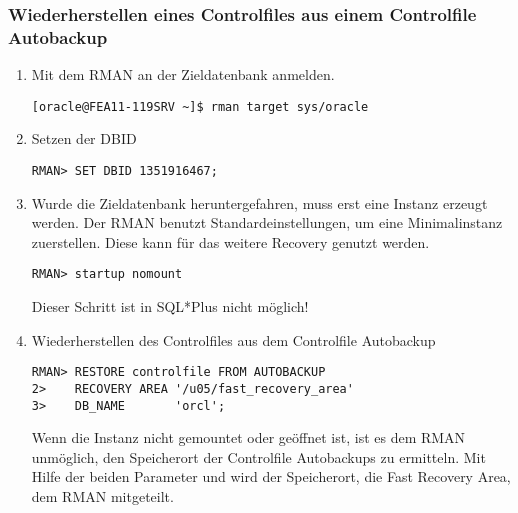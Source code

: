         \subsubsection{Wiederherstellen eines Controlfiles aus einem Controlfile Autobackup}
          \begin{enumerate}
            \item Mit dem RMAN an der Zieldatenbank anmelden.
              \begin{lstlisting}[caption={An der Zieldatenbank anmelden},label=admin1516,language=rman]
[oracle@FEA11-119SRV ~]$ rman target sys/oracle
              \end{lstlisting}
            \item Setzen der DBID
              \begin{lstlisting}[caption={Setzen der DBID},label=admin1517,language=rman]
RMAN> SET DBID 1351916467;
              \end{lstlisting}
            \item Wurde die Zieldatenbank heruntergefahren, muss erst eine Instanz erzeugt werden. Der RMAN benutzt Standardeinstellungen, um eine Minimalinstanz zuerstellen. Diese kann für das weitere Recovery genutzt werden.
              \begin{lstlisting}[caption={Zieldatenbank im RMAN in den NOMOUNT-Status bringen},label=admin1518,language=rman,alsolanguage=sqlplus]
RMAN> startup nomount
              \end{lstlisting}
              \begin{merke}
                Dieser Schritt ist in SQL*Plus nicht möglich!
              \end{merke}
            \item Wiederherstellen des Controlfiles aus dem Controlfile Autobackup
              \begin{lstlisting}[caption={Wiederherstellen des Controlfiles},label=admin1519,language=rman]
RMAN> RESTORE controlfile FROM AUTOBACKUP
2>    RECOVERY AREA '/u05/fast_recovery_area'
3>    DB_NAME       'orcl';
              \end{lstlisting}
              \begin{merke}
                Wenn die Instanz nicht gemountet oder geöffnet ist, ist es dem
                RMAN unmöglich, den Speicherort der Controlfile Autobackups zu
                ermitteln. Mit Hilfe der beiden Parameter  und  wird der Speicherort, die Fast
                Recovery Area, dem RMAN mitgeteilt.

\end{merke}
\end{enumerate}

